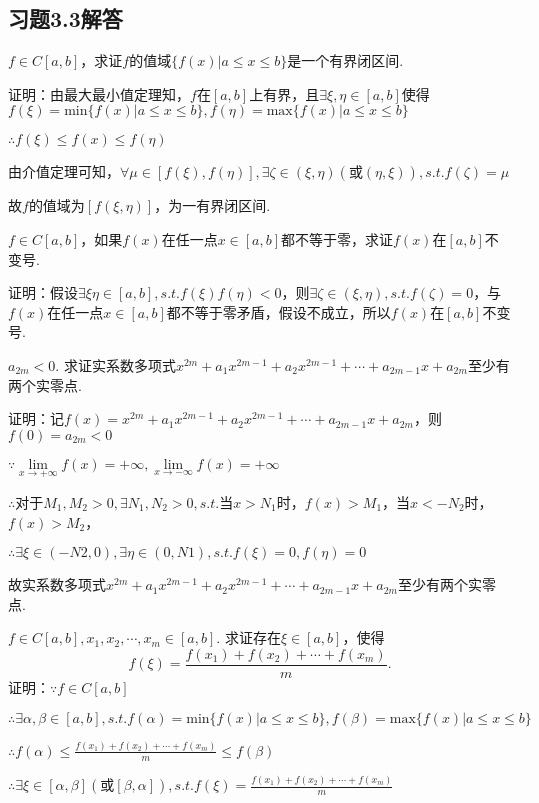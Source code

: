 \documentclass[12pt,UTF8]{ctexart}
\begin{document}
\subsection{习题3.3解答}
\begin{enumerate}
$f\in C[a,b]$，求证$f$的值域$\{f(x)|a\leq x\leq b\}$是一个有界闭区间.

证明：由最大最小值定理知，$f$在$[a,b]$上有界，且$\exists\xi,\eta\in[a,b]$使得$f(\xi)=\text{min}\{f(x)|a\leq x\leq b\},f(\eta)=\text{max}\{f(x)|a\leq x\leq b\}$

$\therefore f(\xi)\leq f(x)\leq f(\eta)$

由介值定理可知，$\forall\mu\in[f(\xi),f(\eta)],\exists\zeta\in(\xi,\eta)(\text{或}(\eta,\xi)),s.t.f(\zeta)=\mu$

故$f$的值域为$[f(\xi,\eta)]$，为一有界闭区间.

$f\in C[a,b]$，如果$f(x)$在任一点$x\in[a,b]$都不等于零，求证$f(x)$在$[a,b]$不变号.

证明：假设$\exists\xi\eta\in[a,b],s.t.f(\xi)f(\eta)<0$，则$\exists\zeta\in(\xi,\eta),s.t.f(\zeta)=0$，与$f(x)$在任一点$x\in[a,b]$都不等于零矛盾，假设不成立，所以$f(x)$在$[a,b]$不变号.

$a_{2m}<0$. 求证实系数多项式$x^{2m}+a_1x^{2m-1}+a_2x^{2m-1}+\cdots+a_{2m-1}x+a_{2m}$至少有两个实零点.

证明：记$f(x)=x^{2m}+a_1x^{2m-1}+a_2x^{2m-1}+\cdots+a_{2m-1}x+a_{2m}$，则$f(0)=a_{2m}<0$

$\because\lim\limits_{x\rightarrow+\infty}f(x)=+\infty,\lim\limits_{x\rightarrow-\infty}f(x)=+\infty$

$\therefore$对于$M_1,M_2>0,\exists N_1,N_2>0,s.t.$当$x>N_1$时，$f(x)>M_1$，当$x<-N_2$时，$f(x)>M_2$，

$\therefore\exists\xi\in(-N2,0),\exists\eta\in(0,N1),s.t.f(\xi)=0,f(\eta)=0$

故实系数多项式$x^{2m}+a_1x^{2m-1}+a_2x^{2m-1}+\cdots+a_{2m-1}x+a_{2m}$至少有两个实零点.

$f\in C[a,b],x_1,x_2,\cdots,x_m\in[a,b]$. 求证存在$\xi\in[a,b]$，使得
\[
f(\xi)=\frac{f(x_1)+f(x_2)+\cdots+f(x_m)}m.
\]
证明：$\because f\in C[a,b]$

$\therefore\exists\alpha,\beta\in[a,b],s.t.f(\alpha)=\text{min}\{f(x)|a\leq x\leq b\},f(\beta)=\text{max}\{f(x)|a\leq x\leq b\}$

$\therefore f(\alpha)\leq\frac{f(x_1)+f(x_2)+\cdots+f(x_m)}m\leq f(\beta)$

$\therefore\exists\xi\in[\alpha,\beta](\text{或}[\beta,\alpha]),s.t.f(\xi)=\frac{f(x_1)+f(x_2)+\cdots+f(x_m)}m$


\end{enumerate}
\end{document}
